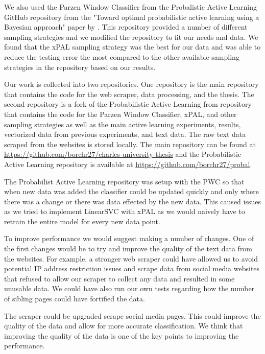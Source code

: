 We also used the Parzen Window Classifier from the Probalistic Active Learning GitHub repository from the "Toward optimal probabilistic active learning using a Bayesian approach" paper by \cite{kottke2021toward}. This repository provided a number of different sampling strategies and we modified the repository to fit our needs and data. We found that the xPAL sampling strategy was the best for our data and was able to reduce the testing error the most compared to the other available sampling strategies in the repository based on our results.

Our work is collected into two repositories. One repository is the main repository that contains the code for the web scraper, data processing, and the thesis. The second repository is a fork of the Probabilistic Active Learning from \cite{kottke2021toward} repository that contains the code for the Parzen Window Classifier, xPAL, and other sampling strategies as well as the main active learning experiments, results, vectorized data from previous experiments, and text data. The raw text data scraped from the websites is stored locally. The main repository can be found at \url{https://github.com/borchr27/charles-university-thesis} and the Probabilistic Active Learning repository is available at \url{https://github.com/borchr27/probal}.

The Probabilist Active Learning repository was setup with the PWC so that when new data was added the classifier could be updated quickly and only where there was a change or there was data effected by the new data. This caused issues as we tried to implement LinearSVC with xPAL as we would naively have to retrain the entire model for every new data point.

To improve performance we would suggest making a number of changes. One of the first changes would be to try and improve the quality of the text data from the websites. For example, a stronger web scraper could have allowed us to avoid potential IP address restriction issues and scrape data from social media websites that refused to allow our scraper to collect any data and resulted in some unusable data. We could have also run our own tests regarding how the number of sibling pages could have fortified the data.

The scraper could be upgraded scrape social media pages. This could improve the quality of the data and allow for more accurate classification. We think that improving the quality of the data is one of the key points to improving the performance.

